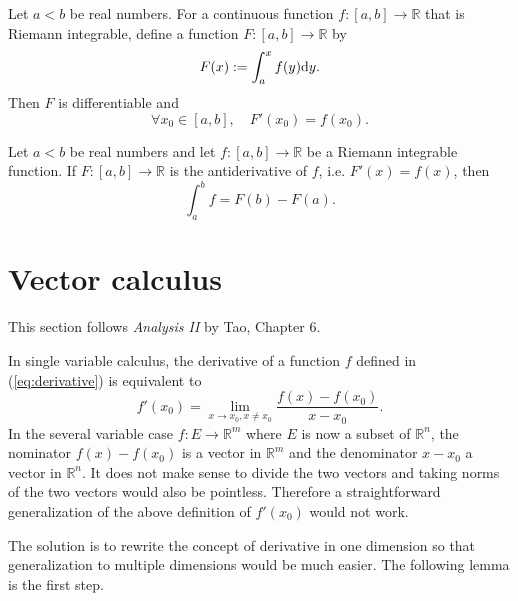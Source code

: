 \begin{thm}
  \label{thm:fundamentalThmCalculus1}
  Let $a<b$ be real numbers.
  For a continuous function $f: [a,b]\rightarrow \mathbb{R}$
  that is Riemann integrable, 
  define a function $F: [a,b]\rightarrow \mathbb{R}$ by
  \begin{equation}
    \label{eq:integralOfRiemannIntF}
    F(x) := \int_a^x f(y) \mathrm{d} y.
  \end{equation}
  Then $F$ is differentiable and
  \begin{equation}
    \label{eq:fundamentalThmCalculus1}
    \forall x_0\in [a,b], \quad
    F'(x_0) = f(x_0).
  \end{equation}
\end{thm}

\begin{thm}
  \label{thm:fundamentalThmCalculus2}
  Let $a<b$ be real numbers
  and let $f: [a,b]\rightarrow \mathbb{R}$
  be a Riemann integrable function.
  If $F:[a,b]\rightarrow\mathbb{R}$ is the antiderivative of $f$,
  i.e. $F'(x)=f(x)$,
  then
  \begin{equation}
    \label{eq:fundamentalThmCalculus2}
    \int_a^b f = F(b) - F(a).
  \end{equation}
\end{thm}


\section{Vector calculus}
\label{sec:sever-vari-diff}

\begin{rem}
  This section follows \emph{Analysis II} by Tao, Chapter 6.
\end{rem}

\begin{rem}
  \label{rem:singleVarDiff2MultiVarDiff}
  In single variable calculus,
  the derivative of a function $f$ defined in (\ref{eq:derivative})
  is equivalent to 
  \begin{displaymath}
    f'(x_0)=\lim_{x\rightarrow x_0, x\ne x_0} \frac{f(x)-f(x_0)}{x-x_0}.
  \end{displaymath}
  In the several variable case $f: E\rightarrow \mathbb{R}^m$
  where $E$ is now a subset of $\mathbb{R}^n$,
  the nominator $f(x)-f(x_0)$ is a vector in $\mathbb{R}^m$
  and the denominator $x-x_0$ a vector in $\mathbb{R}^n$.
  It does not make sense to divide the two vectors and
   taking norms of the two vectors would also be pointless.
  Therefore a straightforward generalization
  of the above definition of $f'(x_0)$ would not work.

  The solution is to rewrite the concept of derivative
  in one dimension so that generalization to multiple dimensions
  would be much easier.
  The following lemma is the first step.
\end{rem}

